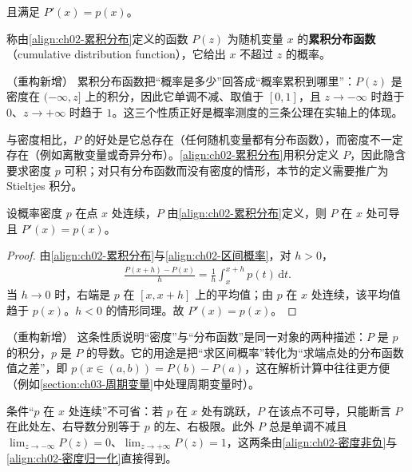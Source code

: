 \documentclass[../../main.tex]{subfiles}
\begin{document}
且满足 $P'(x)=p(x)$。

\begin{definition}[累积分布函数]\label{definition:ch02-累积分布函数}
称由\eqref{align:ch02-累积分布}定义的函数 $P(z)$ 为随机变量 $x$ 的\textbf{累积分布函数}（cumulative distribution function），它给出 $x$ 不超过 $z$ 的概率。
\end{definition}

\begin{remark}（重构新增）
累积分布函数把“概率是多少”回答成“概率累积到哪里”：$P(z)$ 是密度在 $(-\infty,z]$ 上的积分，因此它单调不减、取值于 $[0,1]$，且 $z\to-\infty$ 时趋于 $0$、$z\to+\infty$ 时趋于 $1$。这三个性质正好是概率测度的三条公理在实轴上的体现。

与密度相比，$P$ 的好处是它总存在（任何随机变量都有分布函数），而密度不一定存在（例如离散变量或奇异分布）。\eqref{align:ch02-累积分布}用积分定义 $P$，因此隐含要求密度 $p$ 可积；对只有分布函数而没有密度的情形，本节的定义需要推广为 Stieltjes 积分。
\end{remark}

\begin{proposition}[累积分布函数的导数]\label{proposition:ch02-累积分布导数}
设概率密度 $p$ 在点 $x$ 处连续，$P$ 由\eqref{align:ch02-累积分布}定义，则 $P$ 在 $x$ 处可导且 $P'(x)=p(x)$。
\end{proposition}

\begin{proof}
由\eqref{align:ch02-累积分布}与\eqref{align:ch02-区间概率}，对 $h>0$，
\begin{align*}
  \frac{P(x+h)-P(x)}{h} = \frac{1}{h}\int_{x}^{x+h}p(t)\,\mathrm{d}t .
\end{align*}
当 $h\to0$ 时，右端是 $p$ 在 $[x,x+h]$ 上的平均值；由 $p$ 在 $x$ 处连续，该平均值趋于 $p(x)$。$h<0$ 的情形同理。故 $P'(x)=p(x)$。
\end{proof}

\begin{remark}（重构新增）
这条性质说明“密度”与“分布函数”是同一对象的两种描述：$P$ 是 $p$ 的积分，$p$ 是 $P$ 的导数。它的用途是把“求区间概率”转化为“求端点处的分布函数值之差”，即 $p(x\in(a,b))=P(b)-P(a)$，这在解析计算中往往更方便（例如\cref{section:ch03-周期变量}中处理周期变量时）。

条件“$p$ 在 $x$ 处连续”不可省：若 $p$ 在 $x$ 处有跳跃，$P$ 在该点不可导，只能断言 $P$ 在此处左、右导数分别等于 $p$ 的左、右极限。此外 $P$ 总是单调不减且 $\lim_{z\to-\infty}P(z)=0$、$\lim_{z\to+\infty}P(z)=1$，这两条由\eqref{align:ch02-密度非负}与\eqref{align:ch02-密度归一化}直接得到。
\end{remark}
\end{document}
